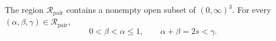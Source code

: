 The region \(\mathcal R_{\mathrm{pair}}\) contains a nonempty open subset of
\((0,\infty)^3\).  For every
\((\alpha,\beta,\gamma)\in\mathcal R_{\mathrm{pair}}\),
\[
0<\beta<\alpha\leq1,
\qquad
\alpha+\beta=2s<\gamma.
\]